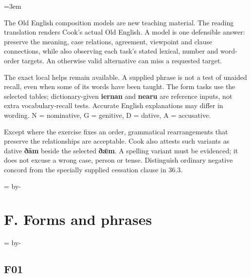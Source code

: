 \BookRecto
\begingroup
\renewcommand{\runningtitle}{Unit 16. Answer key}
\emergencystretch=3em
\newcommand{\itempara}[2]{\par\addvspace{3pt}\noindent\hangindent=1.8em\hangafter=1\makebox[1.8em][l]{#1.}#2\par}
\newcommand{\reserve}[1]{\par\penalty-100\begingroup\dimen0=\pagegoal\advance\dimen0 by-\pagetotal\ifdim\dimen0<#1\newpage\fi\endgroup}

\raggedright
{}

The Old English composition models are new teaching material. The reading translation renders Cook’s actual Old English. A model is one defensible answer: preserve the meaning, case relations, agreement, viewpoint and clause connections, while also observing each task’s stated lexical, number and word-order targets. An otherwise valid alternative can miss a requested target.

The exact local helps remain available. A supplied phrase is not a test of unaided recall, even when some of its words have been taught. The form tasks use the selected tables; dictionary-given \textbf{iernan} and \textbf{nearu} are reference inputs, not extra vocabulary-recall tests. Accurate English explanations may differ in wording. N = nominative, G = genitive, D = dative, A = accusative.

Except where the exercise fixes an order, grammatical rearrangements that preserve the relationships are acceptable. Cook also attests such variants as dative \textbf{ðām} beside the selected \textbf{ðǣm}. A spelling variant must be evidenced; it does not excuse a wrong case, person or tense. Distinguish ordinary negative concord from the specially supplied cessation clause in 36.3.

\reserve{7\baselineskip}
\section*{F. Forms and phrases}

\reserve{8\baselineskip}
\subsection*{F01}

